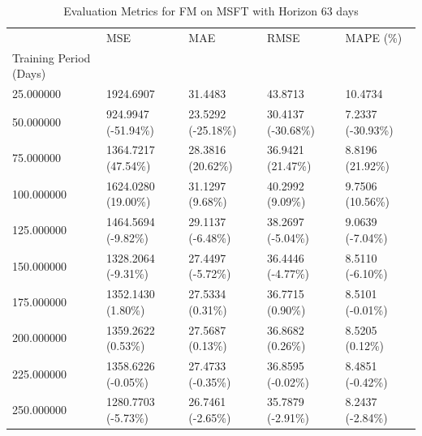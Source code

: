 \begin{table}
\caption{Evaluation Metrics for FM on MSFT with Horizon 63 days}
\label{tab:fm_MSFT_h63_metrics}
\begin{tabular}{lllll}
\toprule
 & MSE & MAE & RMSE & MAPE (\%) \\
Training Period (Days) &  &  &  &  \\
\midrule
25.000000 & 1924.6907 & 31.4483 & 43.8713 & 10.4734 \\
50.000000 & 924.9947 (-51.94\%) & 23.5292 (-25.18\%) & 30.4137 (-30.68\%) & 7.2337 (-30.93\%) \\
75.000000 & 1364.7217 (47.54\%) & 28.3816 (20.62\%) & 36.9421 (21.47\%) & 8.8196 (21.92\%) \\
100.000000 & 1624.0280 (19.00\%) & 31.1297 (9.68\%) & 40.2992 (9.09\%) & 9.7506 (10.56\%) \\
125.000000 & 1464.5694 (-9.82\%) & 29.1137 (-6.48\%) & 38.2697 (-5.04\%) & 9.0639 (-7.04\%) \\
150.000000 & 1328.2064 (-9.31\%) & 27.4497 (-5.72\%) & 36.4446 (-4.77\%) & 8.5110 (-6.10\%) \\
175.000000 & 1352.1430 (1.80\%) & 27.5334 (0.31\%) & 36.7715 (0.90\%) & 8.5101 (-0.01\%) \\
200.000000 & 1359.2622 (0.53\%) & 27.5687 (0.13\%) & 36.8682 (0.26\%) & 8.5205 (0.12\%) \\
225.000000 & 1358.6226 (-0.05\%) & 27.4733 (-0.35\%) & 36.8595 (-0.02\%) & 8.4851 (-0.42\%) \\
250.000000 & 1280.7703 (-5.73\%) & 26.7461 (-2.65\%) & 35.7879 (-2.91\%) & 8.2437 (-2.84\%) \\
\bottomrule
\end{tabular}
\end{table}
